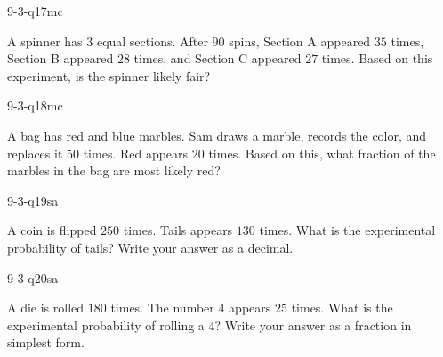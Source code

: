 \begin{practiceQuestion}{9-3-q17}{mc}
\begin{questionText}
A spinner has $3$ equal sections. After $90$ spins, Section A appeared $35$ times, Section B appeared $28$ times, and Section C appeared $27$ times. Based on this experiment, is the spinner likely fair?
\end{questionText}
\end{practiceQuestion}

\begin{practiceQuestion}{9-3-q18}{mc}
\begin{questionText}
A bag has red and blue marbles. Sam draws a marble, records the color, and replaces it $50$ times. Red appears $20$ times. Based on this, what fraction of the marbles in the bag are most likely red?
\end{questionText}
\end{practiceQuestion}


\begin{practiceQuestion}{9-3-q19}{sa}
\begin{questionText}
A coin is flipped $250$ times. Tails appears $130$ times. What is the experimental probability of tails? Write your answer as a decimal.
\end{questionText}
\end{practiceQuestion}

\begin{practiceQuestion}{9-3-q20}{sa}
\begin{questionText}
A die is rolled $180$ times. The number $4$ appears $25$ times. What is the experimental probability of rolling a $4$? Write your answer as a fraction in simplest form.
\end{questionText}
\end{practiceQuestion}

